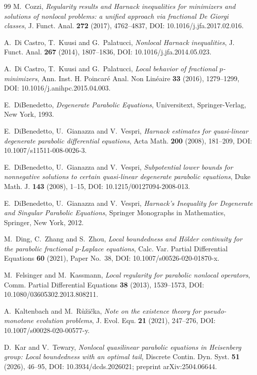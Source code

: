 \documentclass[10pt]{amsart}
\theoremstyle{plain}
\theoremstyle{definition}
\theoremstyle{remark}
\numberwithin{equation}{section}
\begin{document}
\begin{thebibliography}{99}
M.~Cozzi,
\emph{Regularity results and Harnack inequalities for minimizers and
solutions of nonlocal problems: a unified approach via fractional
De Giorgi classes},
J. Funct. Anal. \textbf{272} (2017), 4762--4837,
DOI: 10.1016/j.jfa.2017.02.016.

A.~Di Castro, T.~Kuusi and G.~Palatucci,
\emph{Nonlocal Harnack inequalities},
J. Funct. Anal. \textbf{267} (2014), 1807--1836,
DOI: 10.1016/j.jfa.2014.05.023.

A.~Di Castro, T.~Kuusi and G.~Palatucci,
\emph{Local behavior of fractional $p$-minimizers},
Ann. Inst. H. Poincar\'e Anal. Non Lin\'eaire \textbf{33} (2016),
1279--1299,
DOI: 10.1016/j.anihpc.2015.04.003.

E.~DiBenedetto,
\emph{Degenerate Parabolic Equations},
Universitext,
Springer-Verlag, New York, 1993.

E.~DiBenedetto, U.~Gianazza and V.~Vespri,
\emph{Harnack estimates for quasi-linear degenerate parabolic
differential equations},
Acta Math. \textbf{200} (2008), 181--209,
DOI: 10.1007/s11511-008-0026-3.

E.~DiBenedetto, U.~Gianazza and V.~Vespri,
\emph{Subpotential lower bounds for nonnegative solutions to certain
quasi-linear degenerate parabolic equations},
Duke Math. J. \textbf{143} (2008), 1--15,
DOI: 10.1215/00127094-2008-013.

E.~DiBenedetto, U.~Gianazza and V.~Vespri,
\emph{Harnack's Inequality for Degenerate and Singular Parabolic Equations},
Springer Monographs in Mathematics,
Springer, New York, 2012.

M.~Ding, C.~Zhang and S.~Zhou,
\emph{Local boundedness and H\"older continuity for the parabolic
fractional $p$-Laplace equations},
Calc. Var. Partial Differential Equations \textbf{60} (2021), Paper No.~38,
DOI: 10.1007/s00526-020-01870-x.

M.~Felsinger and M.~Kassmann,
\emph{Local regularity for parabolic nonlocal operators},
Comm. Partial Differential Equations \textbf{38} (2013), 1539--1573,
DOI: 10.1080/03605302.2013.808211.

A.~Kaltenbach and M.~R{\r u}{\v z}i{\v c}ka,
\emph{Note on the existence theory for pseudo-monotone evolution problems},
J. Evol. Equ. \textbf{21} (2021), 247--276,
DOI: 10.1007/s00028-020-00577-y.


D.~Kar and V.~Tewary,
\emph{Nonlocal quasilinear parabolic equations in Heisenberg group:
Local boundedness with an optimal tail},
Discrete Contin. Dyn. Syst. \textbf{51} (2026), 46--95,
DOI: 10.3934/dcds.2026021;
preprint arXiv:2504.06644.


\end{thebibliography}
\end{document}

